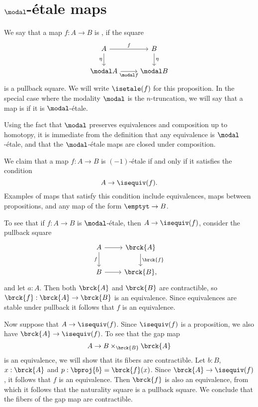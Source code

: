 \documentclass{msc}
\begin{document}
\section{\texorpdfstring{$\modal$}{○}-\'etale maps}

\begin{defn}
We say that a map $f:A\to B$ is , if the square
\begin{equation*}
\begin{tikzcd}
A \arrow[r,"f"] \arrow[d,swap,"\eta"] & B \arrow[d,"\eta"] \\
\modal A \arrow[r,swap,"\modal f"] & \modal B
\end{tikzcd}
\end{equation*}
is a pullback square. We will write $\isetale(f)$ for this proposition. In the special case where the modality $\modal$ is the $n$-truncation, we will say that a map is  if it is $\modal$-\'etale.
\end{defn}

Using the fact that $\modal$ preserves equivalences and composition up to homotopy,
it is immediate from the definition that any equivalence is $\modal$-\'etale, and that the $\modal$-\'etale maps are closed under composition.

\begin{eg}\label{eg:etale_prop}
  We claim that a map $f:A\to B$ is $(-1)$-\'etale if and only if it satisfies the condition
  \begin{equation*}
    A\to \isequiv(f).
  \end{equation*}
  Examples of maps that satisfy this condition include equivalences, maps between propositions, and any map of the form $\emptyt\to B$.

To see that if $f:A\to B$ is $\modal$-\'etale, then $A\to\isequiv(f)$, consider the pullback square
\begin{equation*}
\begin{tikzcd}
A \arrow[r] \arrow[d,swap,"f"] & \brck{A} \arrow[d,"\brck{f}"] \\
B \arrow[r] & \brck{B},
\end{tikzcd}
\end{equation*}
and let $a:A$. Then both $\brck{A}$ and $\brck{B}$ are contractible, so $\brck{f}:\brck{A}\to\brck{B}$ is an equivalence. Since equivalences are stable under pullback it follows that $f$ is an equivalence.

Now suppose that $A\to \isequiv(f)$. Since $\isequiv(f)$ is a proposition, we also have $\brck{A}\to\isequiv(f)$. To see that the gap map
\begin{equation*}
A \to B\times_{\brck{B}}\brck{A}
\end{equation*}
is an equivalence, we will show that its fibers are contractible. Let $b:B$, $x:\brck{A}$ and $p:\bproj{b}=\brck{f}(x)$. Since $\brck{A}\to\isequiv(f)$, it follows that $f$ is an equivalence. Then $\brck{f}$ is also an equivalence, from which it follows that the naturality square is a pullback square. We conclude that the fibers of the gap map are contractible. 
\end{eg}
\end{document}
